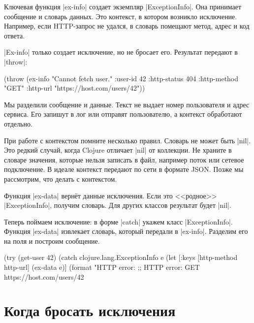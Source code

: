 Ключевая функция \spverb|ex-info| создает экземпляр \spverb|ExceptionInfo|. Она
принимает сообщение и словарь данных. Это контекст, в котором возникло
исключение. Например, если HTTP-запрос не удался, в словарь помещают метод,
адрес и код ответа.

\spverb|Ex-info| только создает исключение, но не бросает его. Результат
передают в \spverb|throw|:

\begin{english}
  \begin{clojure}
(throw (ex-info
        "Cannot fetch user."
        {:user-id 42
         :http-status 404
         :http-method "GET"
         :http-url "https://host.com/users/42"}))
  \end{clojure}
\end{english}

Мы разделили сообщение и данные. Текст не выдает номер пользователя и адрес
сервиса. Его запишут в лог или отправят пользователю, а контекст обработают
отдельно.

При работе с контекстом помните несколько правил. Словарь не может быть
\spverb|nil|. Это редкий случай, когда Clojure отличает \spverb|nil| от
коллекции. Не храните в словаре значения, которые нельзя записать в файл,
например поток или сетевое подключение. В идеале контекст передают по сети в
формате JSON. Позже мы рассмотрим, что делать с контекстом.

Функция \spverb|ex-data| верн\"{е}т данные исключения. Если это <<родное>>
\spverb|ExceptionInfo|, получим словарь. Для других классов результат будет
\spverb|nil|.


Теперь поймаем исключение: в форме \spverb|catch| укажем класс
\spverb|ExceptionInfo|. Функция \spverb|ex-data| извлекает словарь, который
передали в \spverb|ex-info|. Разделим его на поля и построим сообщение.

\begin{english}
  \begin{clojure}
(try
  (get-user 42)
  (catch clojure.lang.ExceptionInfo e
    (let [{:keys [http-method http-url]} (ex-data e)]
      (format "HTTP error: %
;; HTTP error: GET https://host.com/users/42
  \end{clojure}
\end{english}

\section{Когда бросать исключения}

